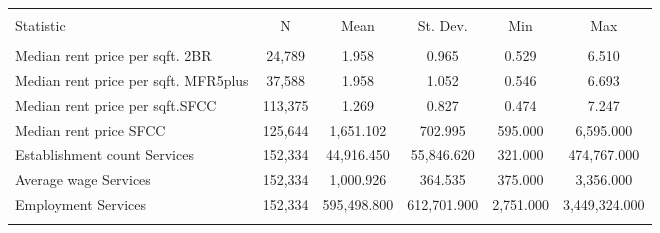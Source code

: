 
\begin{tabular}{@{\extracolsep{5pt}}lccccc} 
\\[-1.8ex]\hline 
\hline \\[-1.8ex] 
Statistic & \multicolumn{1}{c}{N} & \multicolumn{1}{c}{Mean} & \multicolumn{1}{c}{St. Dev.} & \multicolumn{1}{c}{Min} & \multicolumn{1}{c}{Max} \\ 
\hline \\[-1.8ex] 
Median rent price per sqft. 2BR & 24,789 & 1.958 & 0.965 & 0.529 & 6.510 \\ 
Median rent price per sqft. MFR5plus & 37,588 & 1.958 & 1.052 & 0.546 & 6.693 \\ 
Median rent price per sqft.SFCC & 113,375 & 1.269 & 0.827 & 0.474 & 7.247 \\ 
Median rent price SFCC & 125,644 & 1,651.102 & 702.995 & 595.000 & 6,595.000 \\ 
Establishment count Services & 152,334 & 44,916.450 & 55,846.620 & 321.000 & 474,767.000 \\ 
Average wage Services & 152,334 & 1,000.926 & 364.535 & 375.000 & 3,356.000 \\ 
Employment Services & 152,334 & 595,498.800 & 612,701.900 & 2,751.000 & 3,449,324.000 \\ 
\hline \\[-1.8ex] 
\end{tabular} 
